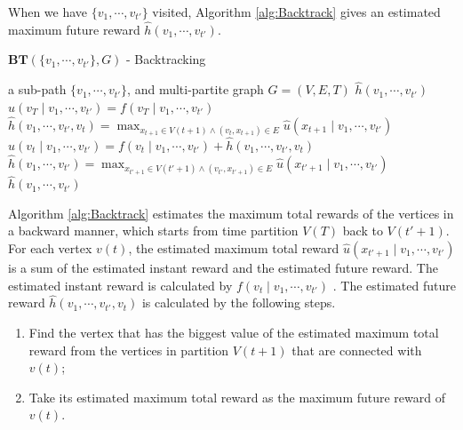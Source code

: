 \documentclass[12pt]{article}
\begin{document}
When we have $ \{ v_{1} , \cdots , v_{t'} \} $ visited, Algorithm \ref{alg:Backtrack} gives an estimated maximum future reward $ \hat{h}( v_{1} , \cdots , v_{t'} ) $. 
 
\begin{algorithm}
\caption{ $ \mathbf{BT}( \{ v_{1} , \cdots , v_{t'} \}, G ) $ - Backtracking }
\label{alg:Backtrack}
\begin{algorithmic}[1]
\REQUIRE
a sub-path $ \{ v_{1} , \cdots , v_{t'} \} $, and multi-partite graph $ G = ( V, E, T ) $
\ENSURE $ \hat{h}( v_{1} , \cdots , v_{t'} ) $ \\
\STATE $ \hat{u}(v_{T} \mid v_{1} , \cdots , v_{t'} ) = f(v_{T} \mid v_{1} , \cdots , v_{t'} ) $
\ELSE
\STATE $ \hat{h}( v_{1} , \cdots , v_{t'},  v_{t} ) = \max_{ { x_{t+1} \in V(t+1) } \land { (v_{t}, x_{t+1}) \in E } } \hat{u}(x_{t+1} \mid v_{1} , \cdots , v_{t'} ) $
\STATE $ \hat{u}(v_{t} \mid v_{1} , \cdots , v_{t'} ) = f(v_{t} \mid v_{1} , \cdots , v_{t'} ) + \hat{h}( v_{1} , \cdots , v_{t'} , v_{t}) $
\ENDIF
\ENDFOR
\ENDFOR
\STATE  $ \hat{h}( v_{1} , \cdots , v_{t'} ) = \max_{ {x_{t'+1} \in V(t'+1)} \land {(v_{t'}, x_{t'+1}) \in E} } \hat{u}(x_{t'+1} \mid v_{1} , \cdots , v_{t'} ) $
\RETURN $ \hat{h}( v_{1} , \cdots , v_{t'} )  $
\end{algorithmic}
\end{algorithm}

Algorithm \ref{alg:Backtrack} estimates the maximum total rewards of the vertices in a backward manner, which starts from time partition $ V(T) $ back to $ V(t'+1) $.
For each vertex $ v(t) $, the estimated maximum total reward $ \hat{u}(x_{t'+1} \mid v_{1} , \cdots , v_{t'} ) $ is a sum of the estimated instant reward and the estimated future reward.
The estimated instant reward is calculated by $ f(v_{t} \mid v_{1} , \cdots , v_{t'} ) $ .
The estimated future reward $ \hat{h}( v_{1} , \cdots , v_{t'} , v_{t}) $ is calculated by the following steps.
\begin{enumerate}
\item Find the vertex that has the biggest value of the estimated maximum total reward from the vertices in partition $ V(t+1) $ that are connected with $ v(t) $;
\item Take its estimated maximum total reward as the maximum future reward of $ v(t) $.
\end{enumerate}
\end{document}
